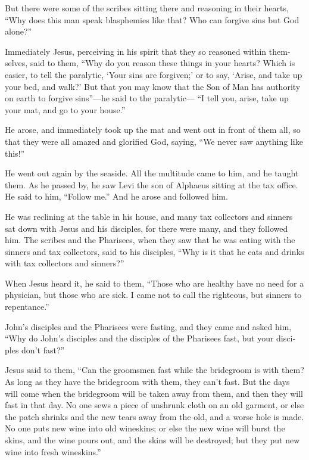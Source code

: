 \begin{paracol}{2}
\begin{otherlanguage}{english}
 But there were some of the scribes sitting there and
reasoning in their hearts,  ``Why does this man speak
blasphemies like that? Who can forgive sins but God alone?''

 Immediately Jesus, perceiving in his spirit that they so
reasoned within themselves, said to them, ``Why do you reason these
things in your hearts?  Which is easier, to tell the
paralytic, `Your sins are forgiven;' or to say, `Arise, and take up your
bed, and walk?'  But that you may know that the Son of
Man has authority on earth to forgive sins''---he said to the
paralytic---  ``I tell you, arise, take up your mat, and
go to your house.''

 He arose, and immediately took up the mat and went out
in front of them all, so that they were all amazed and glorified God,
saying, ``We never saw anything like this!''

 He went out again by the seaside. All the multitude came
to him, and he taught them.  As he passed by, he saw Levi
the son of Alphaeus sitting at the tax office. He said to him, ``Follow
me.'' And he arose and followed him.

 He was reclining at the table in his house, and many tax
collectors and sinners sat down with Jesus and his disciples, for there
were many, and they followed him.  The scribes and the
Pharisees, when they saw that he was eating with the sinners and tax
collectors, said to his disciples, ``Why is it that he eats and drinks
with tax collectors and sinners?''

 When Jesus heard it, he said to them, ``Those who are
healthy have no need for a physician, but those who are sick. I came not
to call the righteous, but sinners to repentance.''

 John's disciples and the Pharisees were fasting, and
they came and asked him, ``Why do John's disciples and the disciples of
the Pharisees fast, but your disciples don't fast?''

 Jesus said to them, ``Can the groomsmen fast while the
bridegroom is with them? As long as they have the bridegroom with them,
they can't fast.  But the days will come when the
bridegroom will be taken away from them, and then they will fast in that
day.  No one sews a piece of unshrunk cloth on an old
garment, or else the patch shrinks and the new tears away from the old,
and a worse hole is made.  No one puts new wine into old
wineskins; or else the new wine will burst the skins, and the wine pours
out, and the skins will be destroyed; but they put new wine into fresh
wineskins.''


\end{otherlanguage}
\end{paracol}

